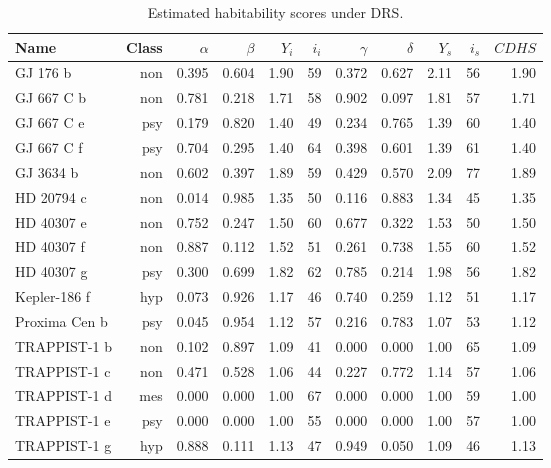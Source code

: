\documentclass[9pt]{article}
\begin{document}
\begin{table}
  \vspace{4em}
  
  \begin{subtable}{\textwidth}
    \centering
    \begin{tabular}{l r r r r r r r r r r}
      \toprule
      Name & Class & $\alpha$ & $\beta$ & $Y_i$ & $i_i$ & $\gamma$ & $\delta$ & $Y_s$ & $i_s$ & $\mathit{CDHS}$\\
      \midrule
      GJ 176 b & non & 0.395 & 0.604 & 1.90 & 59 & 0.372 & 0.627 & 2.11 & 56 & 1.90\\
      GJ 667 C b & non & 0.781 & 0.218 & 1.71 & 58 & 0.902 & 0.097 & 1.81 & 57 & 1.71\\
      GJ 667 C e & psy & 0.179 & 0.820 & 1.40 & 49 & 0.234 & 0.765 & 1.39 & 60 & 1.40\\
      GJ 667 C f & psy & 0.704 & 0.295 & 1.40 & 64 & 0.398 & 0.601 & 1.39 & 61 & 1.40\\
      GJ 3634 b & non & 0.602 & 0.397 & 1.89 & 59 & 0.429 & 0.570 & 2.09 & 77 & 1.89\\
      HD 20794 c & non & 0.014 & 0.985 & 1.35 & 50 & 0.116 & 0.883 & 1.34 & 45 & 1.35\\
      HD 40307 e & non & 0.752 & 0.247 & 1.50 & 60 & 0.677 & 0.322 & 1.53 & 50 & 1.50\\
      HD 40307 f & non & 0.887 & 0.112 & 1.52 & 51 & 0.261 & 0.738 & 1.55 & 60 & 1.52\\
      HD 40307 g & psy & 0.300 & 0.699 & 1.82 & 62 & 0.785 & 0.214 & 1.98 & 56 & 1.82\\
      Kepler-186 f & hyp & 0.073 & 0.926 & 1.17 & 46 & 0.740 & 0.259 & 1.12 & 51 & 1.17\\
      Proxima Cen b & psy & 0.045 & 0.954 & 1.12 & 57 & 0.216 & 0.783 & 1.07 & 53 & 1.12\\
      TRAPPIST-1 b & non & 0.102 & 0.897 & 1.09 & 41 & 0.000 & 0.000 & 1.00 & 65 & 1.09\\
      TRAPPIST-1 c & non & 0.471 & 0.528 & 1.06 & 44 & 0.227 & 0.772 & 1.14 & 57 & 1.06\\
      TRAPPIST-1 d & mes & 0.000 & 0.000 & 1.00 & 67 & 0.000 & 0.000 & 1.00 & 59 & 1.00\\
      TRAPPIST-1 e & psy & 0.000 & 0.000 & 1.00 & 55 & 0.000 & 0.000 & 1.00 & 57 & 1.00\\
      TRAPPIST-1 g & hyp & 0.888 & 0.111 & 1.13 & 47 & 0.949 & 0.050 & 1.09 & 46 & 1.13\\
      \bottomrule
    \end{tabular}
    \caption{Estimated habitability scores under DRS.}\label{tab:cdhsdrs}

\end{subtable}
\end{table}
\end{document}
